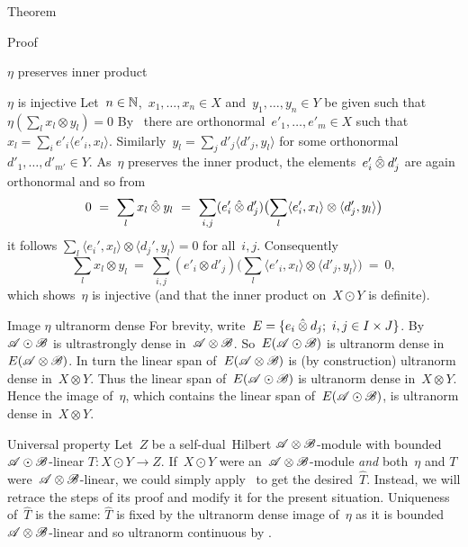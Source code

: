\documentclass[b]{subfiles}
\begin{document}
\begin{parsec}
\begin{point}{Theorem}
\begin{point}{Proof}
\begin{point}{$\eta$ preserves inner product}
\end{point}
\begin{point}{$\eta$ is injective}%
Let~$n \in \mathbb{N}$,~$x_1, \ldots, x_n \in X$
    and~$y_1,\ldots, y_n \in Y$
    be given such that~$\eta(\sum_l x_l \otimes y_l) = 0$
By~
    there are orthonormal~$e'_1,\ldots, e'_m \in X$
    such that~$x_l = \sum_i e'_i \langle e'_i, x_l\rangle$.
Similarly~$y_l = \sum_j d'_j \langle d'_j, y_l\rangle$
for some orthonormal~$d'_1, \ldots, d'_{m'} \in Y$.
As~$\eta$ preserves the inner product,
    the elements~$e_i'\mathbin{\hat{\otimes}} d_j'$ are again orthonormal
    and so from
\begin{equation*}
    0 \ =\  \sum_l x_l \mathbin{\hat{\otimes}} y_l
    \ =\  \sum_{i,j} (e'_i \mathbin{\hat{\otimes}} d'_j) \bigl(\sum_l
         \langle e'_i, x_l\rangle \otimes \langle d'_j, y_l\rangle\bigr)
\end{equation*}
         it follows
         $\sum_l \langle e_i',x_l\rangle \otimes \langle d_j',y_l\rangle = 0$
         for all~$i,j$.
Consequently
\begin{equation*}
    \sum_l x_l \otimes y_l
        \ =\  \sum_{i,j} (e'_i \otimes d'_j) \bigl(\sum_l
        \langle e'_i, x_l \rangle \otimes \langle d'_j, y_l \rangle 
        \bigr) \ = \ 0,
\end{equation*}
which shows~$\eta$ is injective
    (and that the inner product on~$X \odot Y$ is definite).
\end{point}
\begin{point}{Image $\eta$ ultranorm dense}%
For brevity, write~$E = \{ e_i \mathbin{\hat{\otimes}} d_j; \ i,j \in I\times J\}$.
By~\TODO{} $\mathscr{A} \odot \mathscr{B}$ is ultrastrongly dense in~$\mathscr{A} \otimes \mathscr{B}$.
So~$E (\mathscr{A} \odot \mathscr{B})$
    is ultranorm dense in~$E (\mathscr{A} \otimes \mathscr{B})$.
In turn the linear span of~$E (\mathscr{A} \otimes \mathscr{B})$
    is (by construction) ultranorm dense in~$X \otimes Y$.
Thus the linear span of~$E (\mathscr{A} \odot \mathscr{B})$
    is ultranorm dense in~$X \otimes Y$.
Hence the image of~$\eta$,
    which contains the linear span of~$E (\mathscr{A} \odot \mathscr{B})$,
    is ultranorm dense in~$X \otimes Y$.
\end{point}
\begin{point}{Universal property}%
Let~$Z$ be a self-dual~Hilbert $\mathscr{A} \otimes \mathscr{B}$-module
 with bounded~$\mathscr{A} \odot \mathscr{B}$-linear $T\colon X \odot Y \to Z$.
If~$X \odot Y$ were an~$\mathscr{A} \otimes \mathscr{B}$-module
    \emph{and} both~$\eta$ and $T$ were~$\mathscr{A} \otimes \mathscr{B}$-linear,
    we could simply apply~
    to get the desired~$\hat{T}$.
Instead, we will retrace the steps of its proof
    and modify it for the present situation.
Uniqueness of~$\hat{T}$ is the same:
    $\hat{T}$ is fixed by the ultranorm dense image of~$\eta$
    as it is bounded~$\mathscr{A}\otimes\mathscr{B}$-linear
    and so ultranorm continuous by .


\end{point}
\end{point}
\end{point}
\end{parsec}
\end{document}
